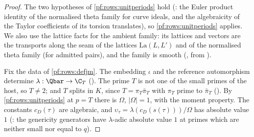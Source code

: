 \begin{proof}
The two hypotheses of \cref{pf:rows:unitperiods} hold (: the Euler product identity of
the normalised theta family for curve ideals, and the algebraicity of the Taylor coefficients of its torsion translates), so
\cref{pf:rows:unitperiods} applies. We also use the lattice facts for the ambient family: its lattices and vectors are the
transports along the seam of the lattices $\mathrm{La}(L,L')$ and of the normalised theta family (for admitted pairs), and the
family is smooth (, from ).

Fix the data of \cref{pf:rows:defjm}. The embedding $\iota$ and the reference automorphism determine $\lambda:\Qbar\to\C_T$
(). The prime $T$ is not one of the small primes of the host, so $T\ne2$; and $T$ splits in
$K$, since $T=\pi_T\bar\pi_T$ with $\pi_T$ prime to $\bar\pi_T$ (). By
\cref{pf:rows:unitperiods} at $p=T$ there is $\Omega$, $|\Omega|=1$, with the moment property. The constants $c_D(\tau)$ are
algebraic, and $\upsilon_\tau=\lambda(c_D(s(\tau)))/\Omega$ has absolute value $1$
(: the genericity generators have $\lambda$-adic absolute value $1$
at primes which are neither small nor equal to $q$).


\end{proof}
